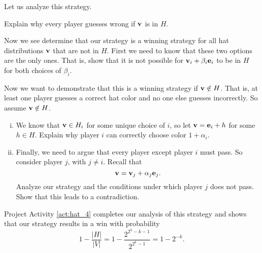 \begin{pactivity} \label{act:hat_4} Let us analyze this strategy.
	\ba
	\item Explain why every player guesses wrong if $\mathbf{v}$ is in $H$. 


	\item Now we see determine that our strategy is a winning strategy for all hat distributions $\mathbf{v}$ that are not in $H$.  First we need to know that these two options are the only ones. That is, show that it is not possible for $\mathbf{v}_i + \beta_i \mathbf{e}_i$ to be in $H$ for both choices of $\beta_i$. 
		
	\item Now we want to demonstrate that this is a winning strategy if $\mathbf{v} \notin H$. That is, at least one player guesses a correct hat color and no one else guesses incorrectly. So assume $\mathbf{v} \notin H$. 
		\begin{enumerate}[i.]
		\item We know that $\mathbf{v} \in H_i$ for some unique choice of $i$, so let $\mathbf{v} = \mathbf{e}_i + h$ for some $h \in H$. Explain why player $i$ can correctly choose color $1+ \alpha_i$. 
		
	\item Finally, we need to argue that every player except player $i$ must pass. So consider player $j$, with $j \neq i$. Recall that 
\[\mathbf{v} = \mathbf{v}_j + \alpha_j \mathbf{e}_j.\]
Analyze our strategy and the conditions under which player $j$ does not pass. Show that this leads to a contradiction. 


		\end{enumerate}
	\ea
\end{pactivity}

Project Activity \ref{act:hat_4} completes our analysis of this strategy and shows that our strategy results in a win with probability 
\[1 - \frac{|H|}{|V|} = 1 - \frac{2^{2^k-k-1}}{2^{2^k-1}} = 1 - 2^{-k}.\]



	
